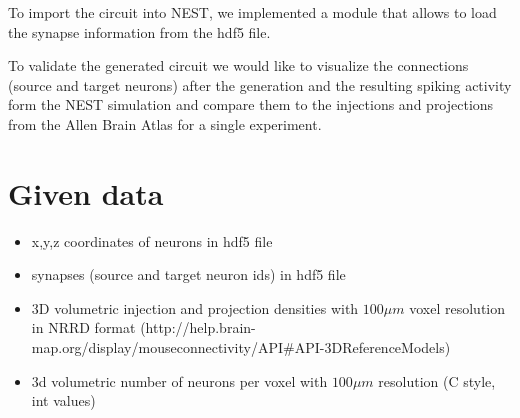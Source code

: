 \documentclass[a4paper]{IEEEtran}
\begin{document}
   
   To import the circuit into NEST, we implemented a module that allows to load the synapse information from the hdf5 file.
   
   To validate the generated circuit we would like to visualize the connections (source and target neurons) after the generation and the resulting spiking activity form the NEST simulation and compare them to the injections and projections from the Allen Brain Atlas for a single experiment.
   
   \section{Given data}
   \begin{itemize}
      \item x,y,z coordinates of neurons in hdf5 file
      \item synapses (source and target neuron ids) in hdf5 file
	  \item 3D volumetric injection and projection densities with $100\mu m$ voxel resolution in NRRD format
	  (http://help.brain-map.org/display/mouseconnectivity/API\#API-3DReferenceModels)
	  \item 3d volumetric number of neurons per voxel with $100\mu m$ resolution (C style, int values)
   \end{itemize}
   
   \begin{figure}[ht!]
   	\begin{center}
        \hspace{0.1cm}
    	   \end{center}
   \label{fig:atlas}
   \end{figure}
   
\end{document}
